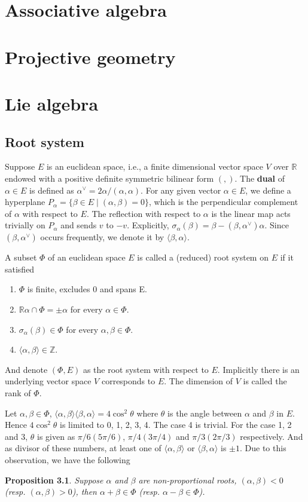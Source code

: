 \documentclass{amsbook}
\newtheorem{proposition}[theorem]{Proposition}
\theoremstyle{definition}
\theoremstyle{remark}
\newcommand{\Z}{\mathbb{Z}}
\newcommand{\R}{\mathbb{R}}
\newcommand{\cartan}[2]{\langle {#1}, {#2} \rangle}
\numberwithin{section}{chapter}
\numberwithin{equation}{chapter}
\begin{document}
\chapter{Associative algebra}


\chapter{Projective geometry}

\chapter{Lie algebra}


\section{Root system}
Suppose $E$ is an euclidean space, i.e., a finite dimensional vector space $V$ over $\R$ endowed with a positive definite symmetric bilinear form $(,)$. The \textbf{dual} of $\alpha\in E$ is defined as $\alpha^\vee = 2\alpha/(\alpha, \alpha)$. For any given vector $\alpha\in E$, we define a hyperplane $P_\alpha = \{\beta\in E \mid (\alpha, \beta) = 0\}$, which is the perpendicular complement of $\alpha$ with respect to $E$. The reflection with respect to $\alpha$ is the linear map acts trivially on $P_\alpha$ and sends $v$ to $-v$. Explicitly, $\sigma_\alpha(\beta) = \beta - (\beta, \alpha^\vee)\alpha$. Since $(\beta, \alpha^\vee)$ occurs frequently, we denote it by $\cartan{\beta}{\alpha}$. 



A subset $\Phi$ of an euclidean space $E$ is called a (reduced) root system on $E$ if it satisfied
\begin{enumerate}
	\item $\Phi$ is finite, excludes 0 and spans E.
	\item $\R\alpha \cap \Phi = {\pm \alpha}$ for every $\alpha \in \Phi$.
	\item $\sigma_{\alpha}(\beta) \in \Phi$ for every $\alpha, \beta \in \Phi$.
	\item $\cartan{\alpha}{\beta} \in \Z$.  
\end{enumerate}
And denote $(\Phi, E)$ as the root system with respect to $E$. Implicitly there is an underlying vector space $V$ corresponds to $E$. The dimension of $V$ is called the rank of $\Phi$.


Let $\alpha, \beta\in\Phi$, $\cartan{\alpha}{\beta}\cartan{\beta}{\alpha} = 4\cos^2\theta$ where $\theta$ is the angle between $\alpha$ and $\beta$ in $E$. Hence $4\cos^2\theta$ is limited to 0, 1, 2, 3, 4. The case 4 is trivial. For the case 1, 2 and 3, $\theta$ is given as $\pi/6(5\pi/6)$, $\pi/4(3\pi/4)$ and $\pi/3(2\pi/3)$ respectively. And as divisor of these numbers, at least one of $\cartan{\alpha}{\beta}$ or $\cartan{\beta}{\alpha}$ is $\pm1$. Due to this observation, we have the following 
\begin{proposition}\label {6.1}
Suppose $\alpha$ and $\beta$ are non-proportional roots, $(\alpha, \beta) < 0$ (resp. $(\alpha, \beta) > 0$), then $\alpha + \beta \in \Phi$ (resp. $\alpha - \beta \in \Phi$).
\end{proposition}
\end{document}
